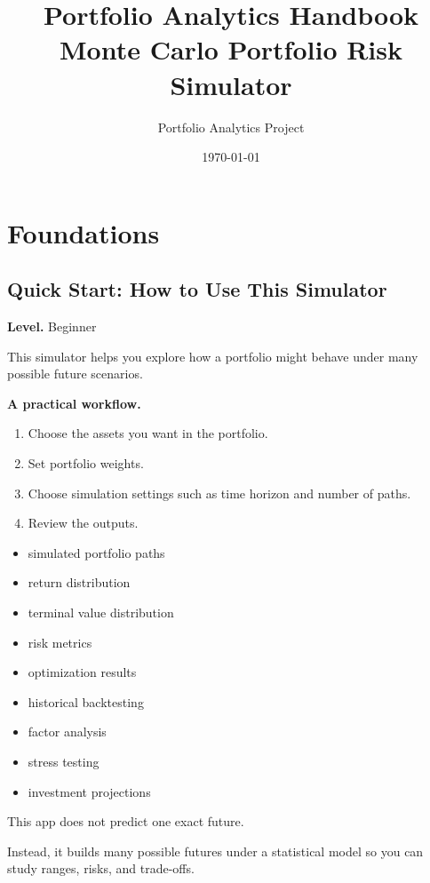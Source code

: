 \documentclass[11pt]{report}
\title{
\Huge Portfolio Analytics Handbook\\
\vspace{6pt}
\Large Monte Carlo Portfolio Risk Simulator
}
\author{Portfolio Analytics Project}
\date{\today}
\begin{document}
\maketitle
\clearpage

\tableofcontents
\clearpage

\chapter{Foundations}

\section{Quick Start: How to Use This Simulator}
\begin{callout}
\textbf{Level.} Beginner
\end{callout}

This simulator helps you explore how a portfolio might behave under many possible future scenarios.

\textbf{A practical workflow.}

\begin{enumerate}
\item Choose the assets you want in the portfolio.
\item Set portfolio weights.
\item Choose simulation settings such as time horizon and number of paths.
\item Review the outputs.
\end{enumerate}

\begin{itemize}
\item simulated portfolio paths
\item return distribution
\item terminal value distribution
\item risk metrics
\item optimization results
\item historical backtesting
\item factor analysis
\item stress testing
\item investment projections
\end{itemize}

This app does not predict one exact future.

Instead, it builds many possible futures under a statistical model so you can study ranges, risks, and trade-offs.
\end{document}
